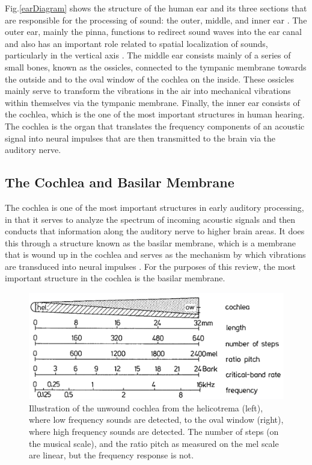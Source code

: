 \documentclass[titlepage]{article}
\begin{document}
    Fig.\ref{earDiagram} shows the structure of the human ear and its three sections that
    are responsible for the processing of sound: the outer, middle, and inner ear \cite{Schnupp2011,Rabiner2007}.
    The outer ear, mainly the pinna, functions to redirect sound waves into the ear canal and
    also has an important role related to spatial localization of sounds, particularly in the vertical axis \cite{Kandel2000}.
    The middle ear consists mainly of a series of small bones, known as the ossicles, connected
    to the tympanic membrane towards the outside and to the oval window of the cochlea on
    the inside. These ossicles mainly serve to transform the vibrations in the air into mechanical
    vibrations within themselves via the tympanic membrane. Finally, the inner ear consists of the
    cochlea, which is the one of the most important structures in human hearing. The cochlea is the
    organ that translates the frequency components of an acoustic signal into neural impulses that
    are then transmitted to the brain via the auditory nerve.

  \subsection{The Cochlea and Basilar Membrane}

    The cochlea is one of the most important structures in early auditory processing,
    in that it serves to analyze the spectrum of incoming acoustic signals and then
    conducts that information along the auditory nerve to higher brain areas.
    It does this through a structure known as the basilar membrane, which is a
    membrane that is wound up in the cochlea and serves as the mechanism by which
    vibrations are transduced into neural impulses \cite{Kandel2000}. For the purposes
    of this review, the most important structure in the cochlea is the basilar membrane.

    \begin{figure}
      \centering
      \includegraphics[scale=0.30]{basilarMembrane}
      \caption{Illustration of the unwound cochlea from the helicotrema (left), where low
      frequency sounds are detected, to the oval window (right), where high
      frequency sounds are detected. The number of steps (on the musical
      scale), and the ratio pitch as measured on the mel scale are linear, but the
      frequency response is not.}
      \label{basilarMembrane}
    \end{figure}
\end{document}
